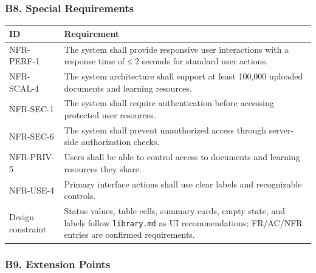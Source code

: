 \documentclass[12pt]{article}
\renewcommand{\baselinestretch}{1.5}
\begin{document}
\hypertarget{sec:b8-special-requirements}{}
\subsubsection*{B8. Special Requirements}
\par\medskip

\begingroup
\small
\renewcommand{\baselinestretch}{1.0}\selectfont
\renewcommand{\arraystretch}{1.15}
\setlength{\tabcolsep}{6pt}
\begin{longtable}{|>{\raggedright\arraybackslash}p{}|>{\raggedright\arraybackslash}p{}|}
\hline
\textbf{ID} & \textbf{Requirement} \\ \hline
\endhead
NFR-PERF-1 & The system shall provide responsive user interactions with a response time of ≤ 2 seconds for standard user actions. \\ \hline
NFR-SCAL-4 & The system architecture shall support at least 100,000 uploaded documents and learning resources. \\ \hline
NFR-SEC-1 & The system shall require authentication before accessing protected user resources. \\ \hline
NFR-SEC-6 & The system shall prevent unauthorized access through server-side authorization checks. \\ \hline
NFR-PRIV-5 & Users shall be able to control access to documents and learning resources they share. \\ \hline
NFR-USE-4 & Primary interface actions shall use clear labels and recognizable controls. \\ \hline
Design constraint & Status values, table cells, summary cards, empty state, and labels follow \texttt{library.md} as UI recommendations; FR/AC/NFR entries are confirmed requirements. \\ \hline
\end{longtable}
\endgroup
\par\medskip

\hypertarget{sec:b9-extension-points}{}
\subsubsection*{B9. Extension Points}
\par\medskip
\end{document}
